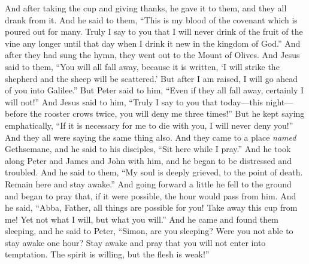 \begin{biblechapter}
\verse And after taking the cup and giving thanks, he gave it to them, and they all drank from it.
\verse And he said to them, “This is my blood of the covenant which is poured out for many.
\verse Truly I say to you that I will never drink of the fruit of the vine any longer until that day when I drink it new in the kingdom of God.”
\verse And after they had sung the hymn, they went out to the Mount of Olives.
 And Jesus said to them, “You will all fall away, because it is written, ‘I will strike the shepherd 
and the sheep will be scattered.’
\verse But after I am raised, I will go ahead of you into Galilee.”
\verse But Peter said to him, “Even if they all fall away, certainly I will not!”
\verse And Jesus said to him, “Truly I say to you that today—this night—before the rooster crows twice, you will deny me three times!”
\verse But he kept saying emphatically, “If it is necessary for me to die with you, I will never deny you!” And they all were saying the same thing also.
 And they came to a place \textit{named} Gethsemane, and he said to his disciples, “Sit here while I pray.”
\verse And he took along Peter and James and John with him, and he began to be distressed and troubled.
\verse And he said to them, “My soul is deeply grieved, to the point of death. Remain here and stay awake.”
\verse And going forward a little he fell to the ground and began to pray that, if it were possible, the hour would pass from him.
\verse And he said, “Abba, Father, all things are possible for you! Take away this cup from me! Yet not what I will, but what you will.”
\verse And he came and found them sleeping, and he said to Peter, “Simon, are you sleeping? Were you not able to stay awake one hour?
\verse Stay awake and pray that you will not enter into temptation. The spirit is willing, but the flesh is weak!”

\end{biblechapter}

